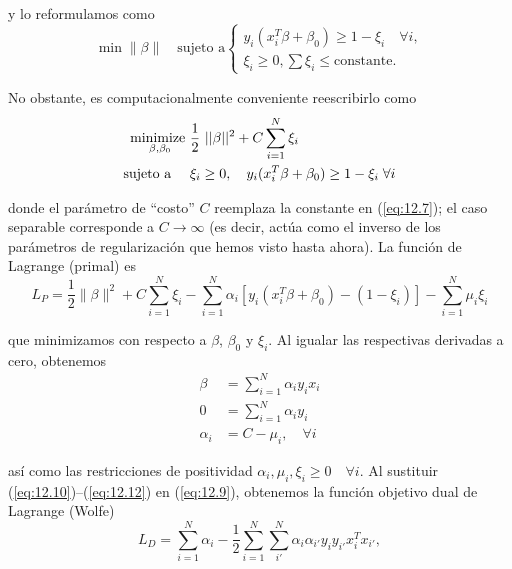 \noindent y lo reformulamos como 
\begin{equation}
\min \|\beta\| \quad \text{sujeto a}
\begin{cases}
y_i (x_i^T \beta + \beta_0) \geq 1 - \xi_i \quad \forall i, \\
\xi_i \geq 0, \sum \xi_i \leq \text{constante}.
\end{cases}
\label{eq:12.7}
\end{equation}

\noindent No obstante, es computacionalmente conveniente reescribirlo como 
\begin{align}
\underset{\beta, \beta_0}{\text{minimize }} & \frac{1}{2} ||\beta||^2 + C\sum_{i = 1}^N \xi_i \notag \\
\text{sujeto a } \quad & \xi_i \geq 0, \quad y_i(x_i^T \beta + \beta_0) \geq 1 - \xi_i \; \forall i \label{eq:12.8} \\
\end{align}

\noindent donde el parámetro de ``costo'' $C$ reemplaza la constante en (\ref{eq:12.7}); el caso separable corresponde a $C \to \infty$ (es decir, actúa como el inverso de los parámetros de regularización que hemos visto hasta ahora). La función de Lagrange (primal) es
\begin{equation}
L_P = \frac{1}{2} \|\beta\|^2 + C \sum_{i=1}^N \xi_i - \sum_{i=1}^N \alpha_i [y_i (x_i^T \beta + \beta_0) - (1 - \xi_i)] - \sum_{i=1}^N \mu_i \xi_i
\label{eq:12.9}
\end{equation}

\noindent que minimizamos con respecto a $\beta$, $\beta_0$ y $\xi_i$. Al igualar las respectivas derivadas a cero, obtenemos
\begin{align}
\beta &= \sum_{i=1}^N \alpha_i y_i x_i \label{eq:12.10} \\
0 &= \sum_{i=1}^N \alpha_i y_i \label{eq:12.11} \\
\alpha_i &= C - \mu_i, \quad \forall i \label{eq:12.12}
\end{align}

\noindent así como las restricciones de positividad $\alpha_i, \mu_i, \xi_i \geq 0 \quad \forall i$. Al sustituir (\ref{eq:12.10})–(\ref{eq:12.12}) en (\ref{eq:12.9}), obtenemos la función objetivo dual de Lagrange (Wolfe)
\begin{equation}
L_D = \sum_{i=1}^N \alpha_i - \frac{1}{2} \sum_{i=1}^N \sum_{i'}^N \alpha_i \alpha_{i'} y_i y_{i'} x_i^T x_{i'},
\label{eq:12.13}
\end{equation}

